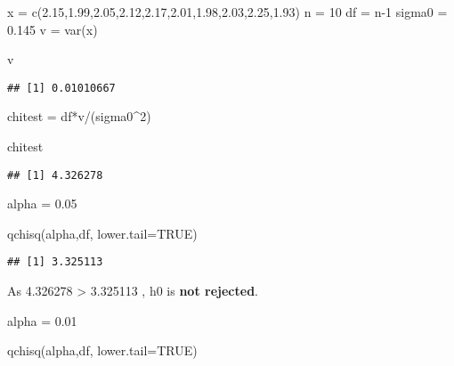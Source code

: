 \documentclass[
]{article}
\newenvironment{Shaded}{\begin{snugshade}}{\end{snugshade}}
\newcommand{\AttributeTok}[1]{\textcolor[rgb]{0.77,0.63,0.00}{#1}}
\newcommand{\ConstantTok}[1]{\textcolor[rgb]{0.00,0.00,0.00}{#1}}
\newcommand{\DecValTok}[1]{\textcolor[rgb]{0.00,0.00,0.81}{#1}}
\newcommand{\FloatTok}[1]{\textcolor[rgb]{0.00,0.00,0.81}{#1}}
\newcommand{\FunctionTok}[1]{\textcolor[rgb]{0.00,0.00,0.00}{#1}}
\newcommand{\NormalTok}[1]{#1}
\newcommand{\OtherTok}[1]{\textcolor[rgb]{0.56,0.35,0.01}{#1}}
\newcommand{\SpecialCharTok}[1]{\textcolor[rgb]{0.00,0.00,0.00}{#1}}
\begin{document}
\begin{Shaded}
\begin{Highlighting}[]
\NormalTok{x }\OtherTok{=} \FunctionTok{c}\NormalTok{(}\FloatTok{2.15}\NormalTok{,}\FloatTok{1.99}\NormalTok{,}\FloatTok{2.05}\NormalTok{,}\FloatTok{2.12}\NormalTok{,}\FloatTok{2.17}\NormalTok{,}\FloatTok{2.01}\NormalTok{,}\FloatTok{1.98}\NormalTok{,}\FloatTok{2.03}\NormalTok{,}\FloatTok{2.25}\NormalTok{,}\FloatTok{1.93}\NormalTok{)}
\NormalTok{n }\OtherTok{=} \DecValTok{10}
\NormalTok{df }\OtherTok{=}\NormalTok{ n}\DecValTok{{-}1}
\NormalTok{sigma0 }\OtherTok{=} \FloatTok{0.145}
\NormalTok{v }\OtherTok{=} \FunctionTok{var}\NormalTok{(x)}

\NormalTok{v}
\end{Highlighting}
\end{Shaded}

\begin{verbatim}
## [1] 0.01010667
\end{verbatim}

\begin{Shaded}
\begin{Highlighting}[]
\NormalTok{chitest }\OtherTok{=}\NormalTok{ df}\SpecialCharTok{*}\NormalTok{v}\SpecialCharTok{/}\NormalTok{(sigma0}\SpecialCharTok{\^{}}\DecValTok{2}\NormalTok{)}

\NormalTok{chitest}
\end{Highlighting}
\end{Shaded}

\begin{verbatim}
## [1] 4.326278
\end{verbatim}

\begin{Shaded}
\begin{Highlighting}[]
\NormalTok{alpha }\OtherTok{=} \FloatTok{0.05}

\FunctionTok{qchisq}\NormalTok{(alpha,df, }\AttributeTok{lower.tail=}\ConstantTok{TRUE}\NormalTok{)}
\end{Highlighting}
\end{Shaded}

\begin{verbatim}
## [1] 3.325113
\end{verbatim}

As 4.326278 \textgreater{} 3.325113 , h0 is \textbf{not rejected}.

\begin{Shaded}
\begin{Highlighting}[]
\NormalTok{alpha }\OtherTok{=} \FloatTok{0.01}

\FunctionTok{qchisq}\NormalTok{(alpha,df, }\AttributeTok{lower.tail=}\ConstantTok{TRUE}\NormalTok{)}
\end{Highlighting}
\end{Shaded}
\end{document}
